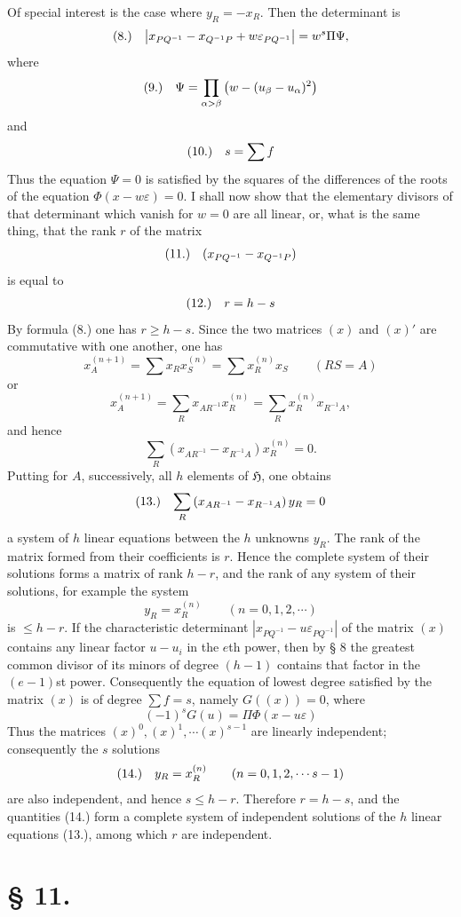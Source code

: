 \documentclass[11pt]{article}
\makeatletter
\newcommand{\Hgrp}{\mathfrak{H}}
\newcommand{\frobtagc}[2]{\[\begin{array}{@{}r@{\quad}c@{}}\textup{(#1)} & \displaystyle #2\end{array}\]}
\makeatother
\begin{document}
Of special interest is the case where $y_R=-x_R$. Then the determinant is
\frobtagc{8.}{\left|x_{PQ^{-1}}-x_{Q^{-1}P}+w\varepsilon_{PQ^{-1}}\right|=w^s\Pi\Psi,}
where
\frobtagc{9.}{\Psi=\prod_{\alpha>\beta}\left(w-(u_\beta-u_\alpha)^2\right)}
and
\frobtagc{10.}{s=\sum f}
Thus the equation $\Psi=0$ is satisfied by the squares of the differences of the roots of the equation $\Phi(x-w\varepsilon)=0$. I shall now show that the elementary divisors of that determinant which vanish for $w=0$ are all linear, or, what is the same thing, that the rank $r$ of the matrix
\frobtagc{11.}{(x_{PQ^{-1}}-x_{Q^{-1}P})}
is equal to
\frobtagc{12.}{r=h-s}
By formula (8.) one has $r\ge h-s$. Since the two matrices $(x)$ and $(x)'$ are commutative with one another, one has
\[
x_A^{(n+1)}=\sum x_Rx_S^{(n)}=\sum x_R^{(n)}x_S\qquad (RS=A)
\]
or
\[
x_A^{(n+1)}=\sum_R x_{AR^{-1}}x_R^{(n)}=\sum_R x_R^{(n)}x_{R^{-1}A},
\]
and hence
\[
\sum_R\left(x_{AR^{-1}}-x_{R^{-1}A}\right)x_R^{(n)}=0.
\]
Putting for $A$, successively, all $h$ elements of $\Hgrp$, one obtains
\frobtagc{13.}{\sum_R\left(x_{AR^{-1}}-x_{R^{-1}A}\right)y_R=0}
a system of $h$ linear equations between the $h$ unknowns $y_R$. The rank of the matrix formed from their coefficients is $r$. Hence the complete system of their solutions forms a matrix of rank $h-r$, and the rank of any system of their solutions, for example the system
\[
y_R=x_R^{(n)}\qquad (n=0,1,2,\cdots)
\]
is $\le h-r$. If the characteristic determinant $\left|x_{PQ^{-1}}-u\varepsilon_{PQ^{-1}}\right|$ of the matrix $(x)$ contains any linear factor $u-u_i$ in the $e$th power, then by § 8 the greatest common divisor of its minors of degree $(h-1)$ contains that factor in the $(e-1)$st power. Consequently the equation of lowest degree satisfied by the matrix $(x)$ is of degree $\sum f=s$, namely $G((x))=0$, where
\[
(-1)^sG(u)=\Pi\Phi(x-u\varepsilon)
\]
Thus the matrices $(x)^0,(x)^1,\cdots(x)^{s-1}$ are linearly independent; consequently the $s$ solutions
\frobtagc{14.}{y_R=x_R^{(n)}\qquad (n=0,1,2,\cdots s-1)}
are also independent, and hence $s\le h-r$. Therefore $r=h-s$, and the quantities (14.) form a complete system of independent solutions of the $h$ linear equations (13.), among which $r$ are independent.

\section*{§ 11.}
\end{document}
